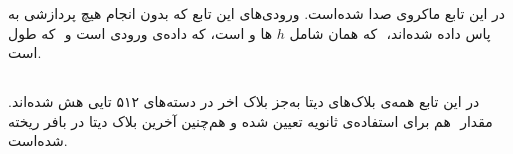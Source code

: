 در این تابع ماکروی\hyperref[subsec:skein-big-core]{} صدا شده‌است. ورودی‌های این تابع که بدون انجام هیچ پردازشی به \hyperref[subsec:skein-big-core]{} پاس داده‌ شده‌اند،‌ ‌ که همان  شامل $h$ ها و  است،  که داده‌ی ورودی است و ‌ که طول   است.


\subsection{}
\label{subsec:skein-big-core}

در این تابع  همه‌ی بلاک‌های دیتا به‌جز بلاک اخر در دسته‌های ۵۱۲ تایی هش شده‌اند. مقدار ‌ هم برای استفاده‌ی ثانویه تعیین شده و هم‌چنین آخرین بلاک دیتا در بافر ریخته‌ شده‌است. \\


